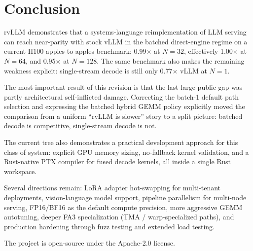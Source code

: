 \section{Conclusion}
\label{sec:conclusion}

rvLLM demonstrates that a systems-language reimplementation of LLM serving can
reach near-parity with stock vLLM in the batched direct-engine regime on a current
H100 apples-to-apples benchmark: 0.99$\times$ at $N\!=\!32$, effectively
1.00$\times$ at $N\!=\!64$, and 0.95$\times$ at $N\!=\!128$. The same benchmark
also makes the remaining weakness explicit: single-stream decode is still only
0.77$\times$ vLLM at $N\!=\!1$.

The most important result of this revision is that the last large public gap was
partly architectural self-inflicted damage. Correcting the batch-1 default path
selection and expressing the batched hybrid GEMM policy explicitly moved the
comparison from a uniform ``rvLLM is slower'' story to a split picture: batched
decode is competitive, single-stream decode is not.

The current tree also demonstrates a practical development approach for this class
of system: explicit GPU memory sizing, no-fallback kernel validation, and a Rust-native
PTX compiler for fused decode kernels, all inside a single Rust workspace.

Several directions remain: LoRA adapter hot-swapping for multi-tenant deployments,
vision-language model support, pipeline parallelism for multi-node serving, FP16/BF16
as the default compute precision, more aggressive GEMM autotuning, deeper FA3
specialization (TMA / warp-specialized paths), and production hardening through fuzz
testing and extended load testing.

The project is open-source under the Apache-2.0 license.



